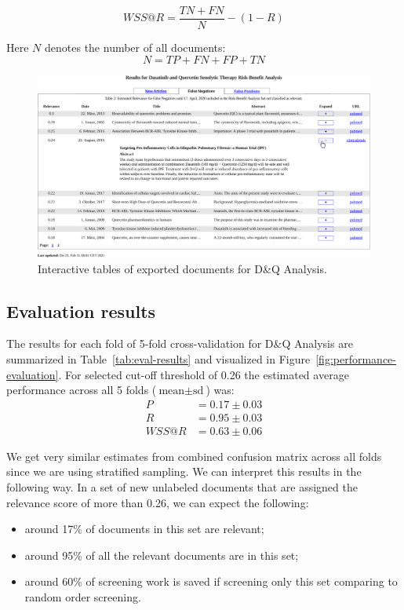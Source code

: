 \documentclass[10pt,twocolumn,letterpaper]{article}
\begin{document}
$$
WSS@R = \frac{TN + FN}{N} - (1 - R)
$$

Here $N$ denotes the number of all documents:
$$
N = TP + FN + FP + TN
$$

\begin{figure}[ht]
\centering
\includegraphics[width=1\textwidth]{../tables/export-tables/export-tables-crop.pdf}
\caption{Interactive tables of exported documents for D\&Q Analysis.}
\label{fig:export}
\end{figure}

\subsection{Evaluation results} \label{sec:eval-results}
The results for each fold of 5-fold cross-validation for D\&Q Analysis are summarized in Table~\ref{tab:eval-results} and visualized in Figure~\ref{fig:performance-evaluation}. For selected cut-off threshold of 0.26 the estimated average performance across all 5 folds ($\text{mean} \pm \text{sd}$) was:
\begin{align*}
P &= 0.17\pm 0.03 \\
R &= 0.95\pm 0.03 \\
WSS@R &= 0.63\pm 0.06
\end{align*}

We get very similar estimates from combined confusion matrix across all folds since we are using stratified sampling. We can interpret this results in the following way. In a set of new unlabeled documents that are assigned the relevance score of more than 0.26, we can expect the following: 
\begin{itemize}
\item around 17\% of documents in this set are relevant;
\item around 95\% of all the relevant documents are in this set;
\item around 60\% of screening work is saved if screening only this set comparing to random order screening.
\end{itemize}
\end{document}

